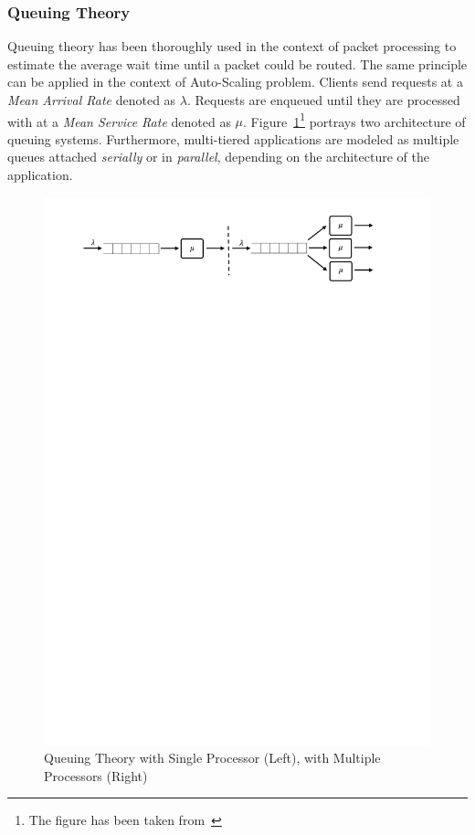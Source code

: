\subsubsection{Queuing Theory}

Queuing theory has been thoroughly used in the context of packet processing to estimate the average wait time until a packet could be routed. The same principle can be applied in the context of Auto-Scaling problem. Clients send requests at a \emph{Mean Arrival Rate} denoted as $\lambda$. Requests are enqueued until they are processed with at a \emph{Mean Service Rate} denoted as $\mu$. Figure~\ref{fig:queue}\footnote{The figure has been taken from~\textcite{Lorido-Botran2014}} portrays two architecture of queuing systems. Furthermore, multi-tiered applications are modeled as multiple queues attached \emph{serially} or in \emph{parallel}, depending on the architecture of the application.
\begin{figure}[h]
    \centering
    \includegraphics[clip, trim=2cm 25cm 3cm 1cm]{queue.pdf}
    \caption{Queuing Theory with Single Processor (Left), with Multiple Processors (Right)}
    \label{fig:queue}
\end{figure}

